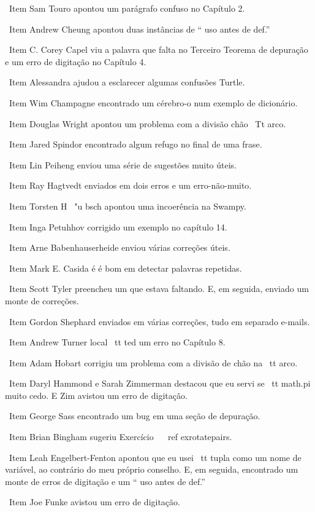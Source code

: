 \documentclass[10pt]{book}
\begin{document}
\begin {itemize}
\ Item Sam Touro apontou um parágrafo confuso no Capítulo 2.

\ Item Andrew Cheung apontou duas instâncias de `` uso antes de def.''

\ Item C. Corey Capel viu a palavra que falta no Terceiro Teorema
de depuração e um erro de digitação no Capítulo 4.

\ Item Alessandra ajudou a esclarecer algumas confusões Turtle.

\ Item Wim Champagne encontrado um cérebro-o num exemplo de dicionário.

\ Item Douglas Wright apontou um problema com a divisão chão
{\ Tt arco}.

\ Item Jared Spindor encontrado algum refugo no final de uma frase.

\ Item Lin Peiheng enviou uma série de sugestões muito úteis.

\ Item Ray Hagtvedt enviados em dois erros e um erro-não-muito.

\ Item Torsten H \ "{u} bsch apontou uma incoerência na Swampy.

\ Item Inga Petuhhov corrigido um exemplo no capítulo 14.

\ Item Arne Babenhauserheide enviou várias correções úteis.

\ Item Mark E. Casida é é bom em detectar palavras repetidas.

\ Item Scott Tyler preencheu um que estava faltando. E, em seguida, enviado
um monte de correções.

\ Item Gordon Shephard enviados em várias correções, tudo em separado
e-mails.

\ Item Andrew Turner {local \ tt} ted um erro no Capítulo 8.

\ Item Adam Hobart corrigiu um problema com a divisão de chão na {\ tt arco}.

\ Item Daryl Hammond e Sarah Zimmerman destacou que eu servi
se {\ tt math.pi} muito cedo. E Zim avistou um erro de digitação.

\ Item George Sass encontrado um bug em uma seção de depuração.

\ Item Brian Bingham sugeriu Exercício ~ \ ref {} exrotatepairs.

\ Item Leah Engelbert-Fenton apontou que eu usei {\ tt tupla}
como um nome de variável, ao contrário do meu próprio conselho. E, em seguida, encontrado
um monte de erros de digitação e um `` uso antes de def.''

\ Item Joe Funke avistou um erro de digitação.


\end{itemize}
\end{document}
